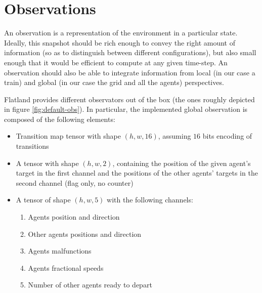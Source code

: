 \documentclass[a4paper,10pt]{report}
\begin{document}
\section{Observations}
An observation is a representation of the environment in a particular state. Ideally, this snapshot should be rich enough to convey the right amount of information (so as to distinguish between different configurations), but also small enough that it would be efficient to compute at any given time-step. An observation should also be able to integrate information from local (in our case a train) and global (in our case the grid and all the agents) perspectives.

Flatland provides different observators out of the box (the ones roughly depicted in figure \ref{fig:default-obs}). In particular, the implemented global observation is composed of the following elements:
\begin{itemize}
	\item Transition map tensor with shape $(h, w, 16)$, assuming $16$ bits encoding of transitions
	\item A tensor with shape $(h, w, 2)$, containing the position of the given agent's target in the first channel and the positions of the other agents' targets in the second channel (flag only, no counter)
	\item A tensor of shape $(h, w, 5)$ with the following channels:
	\begin{enumerate}
		\item Agents position and direction
		\item Other agents positions and direction
		\item Agents malfunctions
		\item Agents fractional speeds
		\item Number of other agents ready to depart
	\end{enumerate}
\end{itemize}
\end{document}
